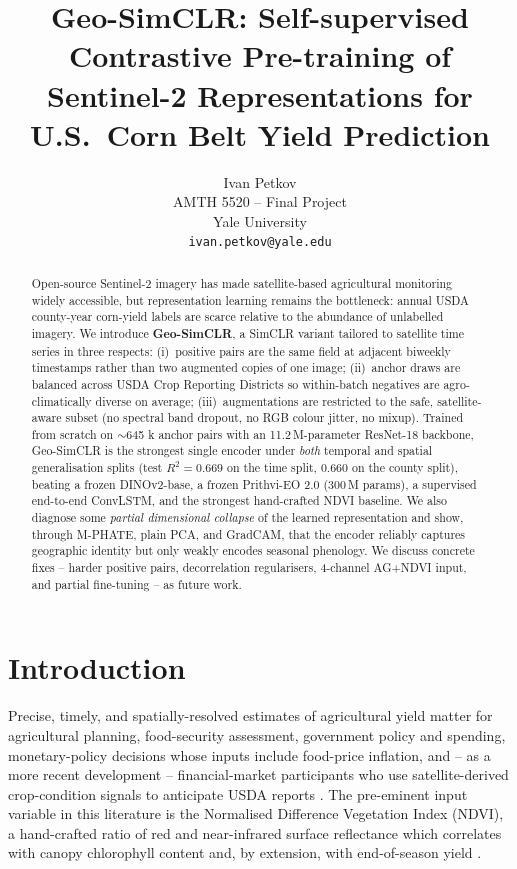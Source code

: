 \documentclass{article}
\title{Geo-SimCLR: Self-supervised Contrastive Pre-training of Sentinel-2
       Representations for U.S.\ Corn Belt Yield Prediction}
\author{%
  Ivan Petkov \\
  AMTH 5520 -- Final Project \\
  Yale University \\
  \texttt{ivan.petkov@yale.edu} \\
}
\begin{document}
\maketitle

\begin{abstract}
Open-source Sentinel-2 imagery has made satellite-based agricultural monitoring
widely accessible, but representation learning remains the bottleneck: annual
USDA county-year corn-yield labels are scarce relative to the abundance of unlabelled imagery. We introduce \textbf{Geo-SimCLR}, a SimCLR variant tailored to satellite time
series in three respects: (i)~positive pairs are the same field at adjacent
biweekly timestamps rather than two augmented copies of one image; (ii)~anchor
draws are balanced across USDA Crop Reporting Districts so within-batch
negatives are agro-climatically diverse on average; (iii)~augmentations are
restricted to the safe, satellite-aware subset (no spectral band dropout, no
RGB colour jitter, no mixup). Trained from scratch on $\sim$645 k anchor pairs
with an 11.2\,M-parameter ResNet-18 backbone, Geo-SimCLR is the strongest single
encoder under \emph{both} temporal and spatial generalisation splits
(test $R^2 = 0.669$ on the time split, $0.660$ on the county split), beating a
frozen DINOv2-base, a frozen Prithvi-EO 2.0 (300\,M params), a supervised
end-to-end ConvLSTM, and the strongest hand-crafted NDVI baseline. We also
diagnose some \emph{partial dimensional collapse} of the learned representation and show, through M-PHATE, plain PCA, and GradCAM, that the encoder reliably
captures geographic identity but only weakly encodes seasonal phenology. We
discuss concrete fixes -- harder positive pairs, decorrelation regularisers,
4-channel AG+NDVI input, and partial fine-tuning -- as future work.
\end{abstract}

\section{Introduction}
Precise, timely, and spatially-resolved estimates of agricultural yield matter
for agricultural planning, food-security assessment, government policy and
spending, monetary-policy decisions whose inputs include food-price inflation,
and -- as a more recent development -- financial-market participants who use
satellite-derived crop-condition signals to anticipate USDA reports
\citep{katona2024,mukherjee2021,ha2025}. The pre-eminent input variable in this
literature is the Normalised Difference Vegetation Index (NDVI), a hand-crafted
ratio of red and near-infrared surface reflectance which correlates with
canopy chlorophyll content and, by extension, with end-of-season yield
\citep{khaki2020cnnrnn,lin2024cropnet}.
\end{document}
